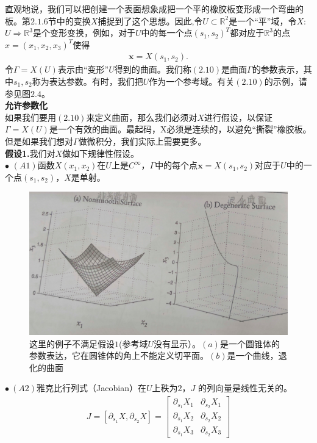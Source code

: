 直观地说，我们可以把创建一个表面想象成把一个平的橡胶板变形成一个弯曲的板。第$2.1.6$节中的变换$X$捕捉到了这个思想。因此,令$U \subset \mathbb{R}^2$是一个“平”域，令$X$:$U\Rightarrow \mathbb{R}^3$是个变形变换，例如，对于$U$中的每一个点$(s_1,s_2)^T$都对应于$\mathbb{R}^3$的点$x= (x_1,x_2, x_3)^T$使得
\begin{gather}
\mathbf{x}=X(s_1,s_2).
\end{gather}
令$\Gamma=X(U)$表示由“变形”$U$得到的曲面。我们称$(2.10)$是曲面$\Gamma$的参数表示，其中$s_1,s_2$称为表达参数。有时，我们把$U$作为一个参考域。有关$(2.10)$的示例，请参见图$2.4$。\\
\textbf{允许参数化}\\
如果我们要用$(2.10)$来定义曲面，那么我们必须对$X$进行假设，以保证$\Gamma=X(U)$是一个有效的曲面。最起码，X必须是连续的，以避免“撕裂”橡胶板。但是如果我们想对$\Gamma$做微积分，我们实际上需要更多。\\
\textbf{假设1.}我们对$X$做如下规律性假设。\\
$\bullet$ $(A1)$函数$X(x_1,x_2)$在$U$上是$C^{\infty}$，$\Gamma$中的每个点$\mathbf{x} = X(s_1,s_2)$对应于$U$中的一个点$(s_1, s_2)$，$X$是单射。
\begin{figure}[H]
\centering
\includegraphics[scale=0.5]{./figures/25.png}
\caption{这里的例子不满足假设$1$(参考域$U$没有显示）。$(a)$是一个圆锥体的参数表达，它在圆锥体的角上不能定义切平面。$(b)$是一个曲线，退化的曲面}
\end{figure}
$\bullet~(A2)$雅克比行列式（Jacobian）在$U$上秩为$2$，$J$ 的列向量是线性无关的。
\begin{gather}
J=\left[ \partial _{s_1}X,\partial _{s_2}X \right]=
\begin{bmatrix}
\partial _{s_1}X_1  & \partial _{s_2}X_1 \\
\partial _{s_1}X_2  & \partial _{s_2}X_2 \\
\partial _{s_1}X_3  & \partial _{s_2}X_3 
\end{bmatrix}
\end{gather}


